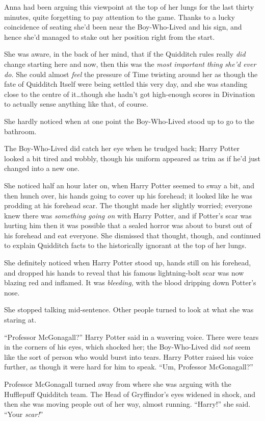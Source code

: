 Anna had been arguing this viewpoint at the top of her lungs for the last
thirty minutes, quite forgetting to pay attention to the game. Thanks to a
lucky coincidence of seating she’d been near the Boy-Who-Lived and his sign,
and hence she’d managed to stake out her position right from the start.

She was aware, in the back of her mind, that if the Quidditch rules really
\emph{did} change starting here and now, then this was the \emph{most important
thing she’d ever do.} She could almost \emph{feel} the pressure of Time
twisting around her as though the fate of Quidditch Itself were being settled
this very day, and she was standing close to the centre of it…though
she hadn’t got high-enough scores in Divination to actually sense anything
like that, of course.

She hardly noticed when at one point the Boy-Who-Lived stood up to go to the
bathroom.

The Boy-Who-Lived did catch her eye when he trudged back; Harry Potter looked a
bit tired and wobbly, though his uniform appeared as trim as if he’d just
changed into a new one.

She noticed half an hour later on, when Harry Potter seemed to sway a bit, and
then hunch over, his hands going to cover up his forehead; it looked like he
was prodding at his forehead scar. The thought made her slightly worried;
everyone knew there was \emph{something going on} with Harry Potter, and if
Potter’s scar was hurting him then it was possible that a sealed horror was
about to burst out of his forehead and eat everyone. She dismissed that
thought, though, and continued to explain Quidditch facts to the historically
ignorant at the top of her lungs.

She definitely noticed when Harry Potter stood up, hands still on his forehead,
and dropped his hands to reveal that his famous lightning-bolt scar was now
blazing red and inflamed. It was \emph{bleeding,} with the blood dripping down
Potter’s nose.

She stopped talking mid-sentence. Other people turned to look at what she was
staring at.

“Professor McGonagall?” Harry Potter said in a wavering voice. There were tears
in the corners of his eyes, which shocked her; the Boy-Who-Lived did \emph{not}
seem like the sort of person who would burst into tears. Harry Potter raised
his voice further, as though it were hard for him to speak. “Um, Professor
McGonagall?”

Professor McGonagall turned away from where she was arguing with the Hufflepuff
Quidditch team. The Head of Gryffindor’s eyes widened in shock, and then she
was moving people out of her way, almost running. “Harry!” she said. “Your
\emph{scar!}”

